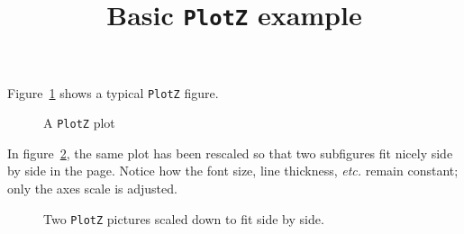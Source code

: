 \documentclass{article}
\title{Basic \texttt{PlotZ} example}
\date{}
\author{}
\begin{document}
\maketitle

Figure~\ref{fig:plotz} shows a typical \texttt{PlotZ} figure.

\begin{figure}[h]
  \centering
  \caption{A \texttt{PlotZ} plot}
  \label{fig:plotz}
\end{figure}

\vfill

In figure~\ref{fig:plotz*}, the same plot has been rescaled so that two
subfigures fit nicely side by side in the page. Notice how the font size, line
thickness, \textit{etc.} remain constant; only the axes scale is adjusted.

\begin{figure}[h]
  \centering
  \hfill%
  \caption{Two \texttt{PlotZ} pictures scaled down to fit side by side.}
  \label{fig:plotz*}
\end{figure}
\end{document}
